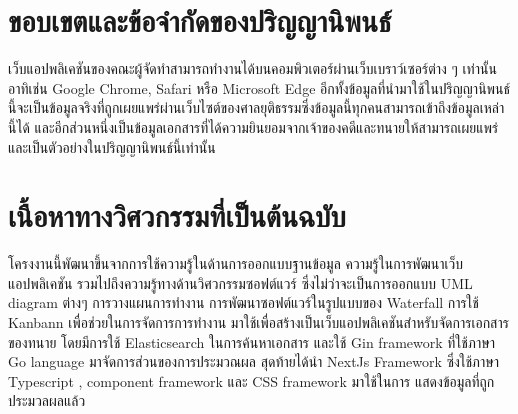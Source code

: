 \documentclass[12pt,oneside,openright,a4paper]{cpe-thai-project}
\begin{document}
\section{ขอบเขตและข้อจำกัดของปริญญานิพนธ์}
\hspace*{1cm}เว็บแอปพลิเคชันของคณะผู้จัดทำสามารถทำงานได้บนคอมพิวเตอร์ผ่านเว็บเบราว์เซอร์ต่าง ๆ เท่านั้นอาทิเช่น Google Chrome, Safari หรือ Microsoft Edge อีกทั้งข้อมูลที่นำมาใช้ในปริญญานิพนธ์นี้จะเป็นข้อมูลจริงที่ถูกเผยแพร่ผ่านเว็บไซต์ของศาลยุติธรรมซึ่งข้อมูลนี้ทุกคนสามารถเข้าถึงข้อมูลเหล่านี้ได้ และอีกส่วนหนึ่งเป็นข้อมูลเอกสารที่ได้ความยินยอมจากเจ้าของคดีและทนายให้สามารถเผยแพร่และเป็นตัวอย่างในปริญญานิพนธ์นี้เท่านั้น

\section{เนื้อหาทางวิศวกรรมที่เป็นต้นฉบับ}
\hspace*{1cm}โครงงานนี้พัฒนาขึ้นจากการใช้ความรู้ในด้านการออกแบบฐานข้อมูล ความรู้ในการพัฒนาเว็บแอปพลิเคชัน รวมไปถึงความรู้ทางด้านวิศวกรรมซอฟต์แวร์ ซึ่งไม่ว่าจะเป็นการออกแบบ UML diagram ต่างๆ การวางแผนการทำงาน การพัฒนาซอฟต์แวร์ในรูปแบบของ Waterfall การใช้ Kanbann เพื่อช่วยในการจัดการการทำงาน มาใช้เพื่อสร้างเป็นเว็บแอปพลิเคชันสำหรับจัดการเอกสารของทนาย โดยมีการใช้ Elasticsearch ในการค้นหาเอกสาร และใช้ Gin framework ที่ใช้ภาษา Go language มาจัดการส่วนของการประมวณผล สุดท้ายได้นำ NextJs Framework ซึ่งใช้ภาษา Typescript , component framework และ CSS framework มาใช้ในการ แสดงข้อมูลที่ถูกประมวลผลแล้ว 

\newpage
\end{document}
